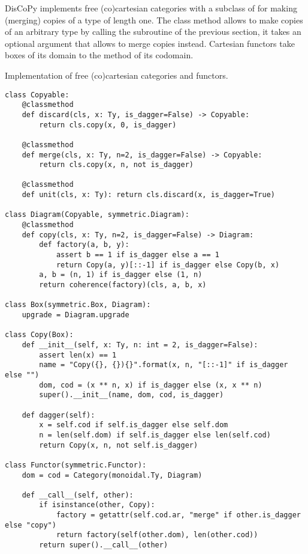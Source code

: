 DisCoPy implements free (co)cartesian categories with a subclass of  for making (merging)  copies of a type  of length one.
The class method  allows to make  copies of an arbitrary type  by calling the  subroutine of the previous section, it takes an optional argument  that allows to merge copies instead.
Cartesian functors take  boxes of its domain to the  method of its codomain.

\begin{python}
{\normalfont Implementation of free (co)cartesian categories and functors.}

\begin{verbatim}
class Copyable:
    @classmethod
    def discard(cls, x: Ty, is_dagger=False) -> Copyable:
        return cls.copy(x, 0, is_dagger)

    @classmethod
    def merge(cls, x: Ty, n=2, is_dagger=False) -> Copyable:
        return cls.copy(x, n, not is_dagger)

    @classmethod
    def unit(cls, x: Ty): return cls.discard(x, is_dagger=True)

class Diagram(Copyable, symmetric.Diagram):
    @classmethod
    def copy(cls, x: Ty, n=2, is_dagger=False) -> Diagram:
        def factory(a, b, y):
            assert b == 1 if is_dagger else a == 1
            return Copy(a, y)[::-1] if is_dagger else Copy(b, x)
        a, b = (n, 1) if is_dagger else (1, n)
        return coherence(factory)(cls, a, b, x)

class Box(symmetric.Box, Diagram):
    upgrade = Diagram.upgrade

class Copy(Box):
    def __init__(self, x: Ty, n: int = 2, is_dagger=False):
        assert len(x) == 1
        name = "Copy({}, {}){}".format(x, n, "[::-1]" if is_dagger else "")
        dom, cod = (x ** n, x) if is_dagger else (x, x ** n)
        super().__init__(name, dom, cod, is_dagger)

    def dagger(self):
        x = self.cod if self.is_dagger else self.dom
        n = len(self.dom) if self.is_dagger else len(self.cod)
        return Copy(x, n, not self.is_dagger)

class Functor(symmetric.Functor):
    dom = cod = Category(monoidal.Ty, Diagram)

    def __call__(self, other):
        if isinstance(other, Copy):
            factory = getattr(self.cod.ar, "merge" if other.is_dagger else "copy")
            return factory(self(other.dom), len(other.cod))
        return super().__call__(other)
\end{verbatim}
\end{python}

